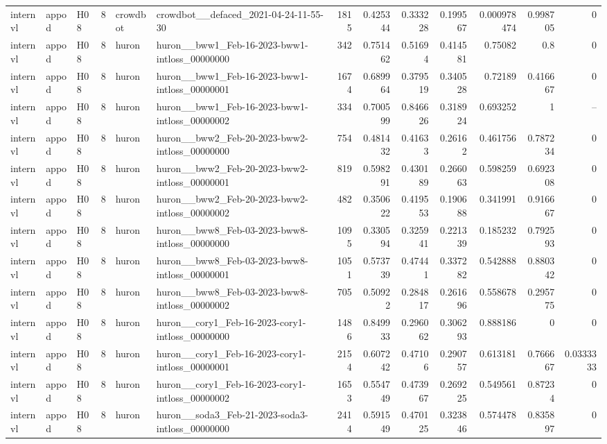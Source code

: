 \begin{longtable}{lllrllrrrrrrr}
internvl & appod & H08 & 8 & crowdbot & crowdbot\_\_defaced\_2021-04-24-11-55-30 & 1815 & 0.425344 & 0.333228 & 0.199567 & 0.000978474 & 0.998705 & 0 \\
internvl & appod & H08 & 8 & huron & huron\_\_bww1\_Feb-16-2023-bww1-intloss\_00000000 & 342 & 0.751462 & 0.51694 & 0.414581 & 0.75082 & 0.8 & 0 \\
internvl & appod & H08 & 8 & huron & huron\_\_bww1\_Feb-16-2023-bww1-intloss\_00000001 & 1674 & 0.689964 & 0.379519 & 0.340528 & 0.72189 & 0.416667 & 0 \\
internvl & appod & H08 & 8 & huron & huron\_\_bww1\_Feb-16-2023-bww1-intloss\_00000002 & 334 & 0.700599 & 0.846626 & 0.318924 & 0.693252 & 1 & -- \\
internvl & appod & H08 & 8 & huron & huron\_\_bww2\_Feb-20-2023-bww2-intloss\_00000000 & 754 & 0.481432 & 0.41633 & 0.26162 & 0.461756 & 0.787234 & 0 \\
internvl & appod & H08 & 8 & huron & huron\_\_bww2\_Feb-20-2023-bww2-intloss\_00000001 & 819 & 0.598291 & 0.430189 & 0.266063 & 0.598259 & 0.692308 & 0 \\
internvl & appod & H08 & 8 & huron & huron\_\_bww2\_Feb-20-2023-bww2-intloss\_00000002 & 482 & 0.350622 & 0.419553 & 0.190688 & 0.341991 & 0.916667 & 0 \\
internvl & appod & H08 & 8 & huron & huron\_\_bww8\_Feb-03-2023-bww8-intloss\_00000000 & 1095 & 0.330594 & 0.325941 & 0.221339 & 0.185232 & 0.792593 & 0 \\
internvl & appod & H08 & 8 & huron & huron\_\_bww8\_Feb-03-2023-bww8-intloss\_00000001 & 1051 & 0.573739 & 0.47441 & 0.337282 & 0.542888 & 0.880342 & 0 \\
internvl & appod & H08 & 8 & huron & huron\_\_bww8\_Feb-03-2023-bww8-intloss\_00000002 & 705 & 0.50922 & 0.284817 & 0.261696 & 0.558678 & 0.295775 & 0 \\
internvl & appod & H08 & 8 & huron & huron\_\_cory1\_Feb-16-2023-cory1-intloss\_00000000 & 1486 & 0.849933 & 0.296062 & 0.306293 & 0.888186 & 0 & 0 \\
internvl & appod & H08 & 8 & huron & huron\_\_cory1\_Feb-16-2023-cory1-intloss\_00000001 & 2154 & 0.607242 & 0.47106 & 0.290757 & 0.613181 & 0.766667 & 0.0333333 \\
internvl & appod & H08 & 8 & huron & huron\_\_cory1\_Feb-16-2023-cory1-intloss\_00000002 & 1653 & 0.554749 & 0.473967 & 0.269225 & 0.549561 & 0.87234 & 0 \\
internvl & appod & H08 & 8 & huron & huron\_\_soda3\_Feb-21-2023-soda3-intloss\_00000000 & 2414 & 0.591549 & 0.470125 & 0.323846 & 0.574478 & 0.835897 & 0 \\

\end{longtable}
